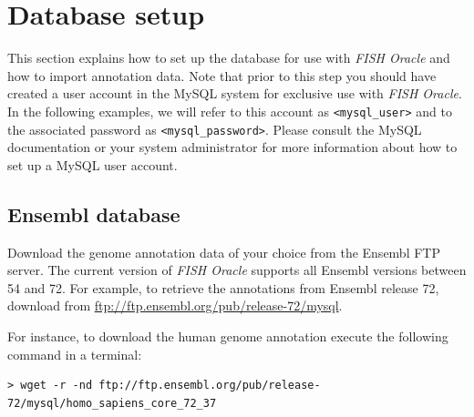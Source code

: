 \documentclass[11pt,final]{article}
\newcommand{\FO}[0]{\emph{FISH Oracle}\xspace}
\begin{document}

\section{Database setup}
\label{db-setup}

This section explains how to set up the database for use with \FO and how to
import annotation data. Note that prior to this step you should have created a
user account in the MySQL system for exclusive use with \FO. In the following
examples, we will refer to this account as \texttt{<mysql\_user>} and to the
associated password as \texttt{<mysql\_password>}. Please consult the MySQL
documentation or your system administrator for more information about how to
set up a MySQL user account.

\subsection{Ensembl database}

Download the genome annotation data of your choice from the Ensembl FTP server.
The current version of \FO supports all Ensembl versions between 54
and 72. For example, to retrieve the annotations from Ensembl release 72,
download from \url{ftp://ftp.ensembl.org/pub/release-72/mysql}.

For instance, to download the human genome annotation execute the following
command in a terminal:

\begin{lstlisting}
> wget -r -nd ftp://ftp.ensembl.org/pub/release-72/mysql/homo_sapiens_core_72_37
\end{lstlisting}
\end{document}
